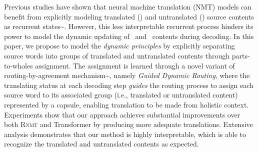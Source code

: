 Previous studies have shown that neural machine translation (NMT) models can benefit from explicitly modeling translated (\past) and untranslated (\future) source contents as recurrent states{\textasciitilde}\cite{zheng2018modeling}. 
However, this less interpretable recurrent process hinders its power to model the dynamic updating of \past\ and \future\ contents during decoding.
In this paper, we propose to model the \textit{dynamic principles} by explicitly separating source words into groups of translated and untranslated contents through parts-to-wholes assignment.
The assignment is learned through a novel variant of routing-by-agreement mechanism{\textasciitilde}\cite{sabour2017dynamic}, namely {\em Guided Dynamic Routing}, where the translating status at each decoding step \textit{guides} the routing process to assign each source word to its associated group (i.e., translated or untranslated content)  represented by a capsule, enabling translation to be made from holistic context.
Experiments show that our approach achieves substantial improvements over both \textsc{Rnmt} and Transformer by producing more adequate translations. Extensive analysis demonstrates that our method is highly interpretable, which is able to recognize the translated and untranslated contents as expected.